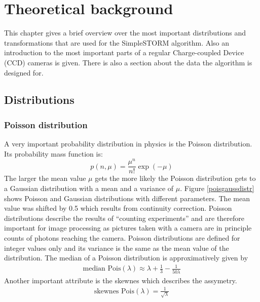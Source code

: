 \chapter{Theoretical background}
This chapter gives a brief overview over the most important distributions and transformations that are used for the SimpleSTORM algorithm. Also an introduction to the most important parts of a regular Charge-coupled Device (CCD) cameras is given. There is also a section about the data the algorithm is designed for.
\section{Distributions}
\subsection{Poisson distribution}
A very important probability distribution in physics is the Poisson
distribution. Its probability mass function is:
\begin{equation}
	p(n,\mu) = \frac{\mu^n}{n!}\exp(-\mu)
\end{equation}
The larger the mean value $\mu$ gets the more likely the Poisson distribution gets to a Gaussian distribution with a mean and a variance of $\mu$. Figure \ref{poisgaussdistr} shows Poisson and Gaussian distributions with different parameters. The mean value was shifted by 0.5 which results from continuity correction.\newline
Poisson distributions describe the results of ``counting experiments'' and are
therefore important for image processing as pictures taken with a
camera are in principle counts of photons reaching the camera.  \newline
Poisson distributions are defined for integer values only and its variance is
the same as the mean value of the distribution.\newline
The median of a Poisson distribution is approximatively given by
\begin{align}
	\text{median Pois}(\lambda) \approx \lambda + \frac{1}{3} - \frac{1}{50\lambda}
\end{align}
Another important attribute is
the skewnes which describes the assymetry.
\begin{align}
 \text{skewnes Pois}(\lambda) = \frac{1}{\sqrt{\lambda}}
\end{align}

